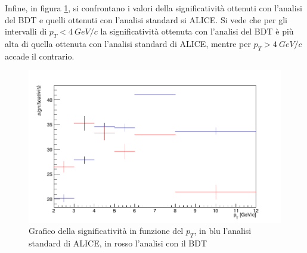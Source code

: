 Infine, in figura \ref{fig:confr_sign}, si confrontano i valori della significatività ottenuti con l'analisi del BDT e quelli ottenuti con l'analisi standard si ALICE. Si vede che per gli intervalli di $p_T < 4 \ GeV/c$ la significatività ottenuta con l'analisi del BDT è più alta di quella ottenuta con l'analisi standard di ALICE, mentre per $p_T > 4 \ GeV/c$ accade il contrario. 

\begin{figure}[htbp] 
        \centering
        \includegraphics[width=0.9\linewidth]{AnalisiDati/confr_sign.png}
        \caption{Grafico della significatività in funzione del $p_T$, in blu l'analisi standard di ALICE, in rosso l'analisi con il BDT}
        \label{fig:confr_sign}
    \end{figure}
